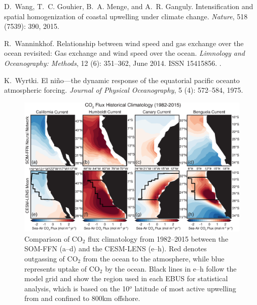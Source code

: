 \documentclass[hvmath, online,bgd]{copernicus_discussions}
\begin{document}
\begin{thebibliography}{84}
	D.~Wang, T.~C. Gouhier, B.~A. Menge, and A.~R. Ganguly.
	\newblock Intensification and spatial homogenization of coastal upwelling under
	climate change.
	\newblock \emph{Nature}, 518 (7539): 390, 2015.
	
	R.~Wanninkhof.
	\newblock Relationship between wind speed and gas exchange over the ocean
	revisited: {Gas} exchange and wind speed over the ocean.
	\newblock \emph{Limnology and Oceanography: Methods}, 12 (6):
	351--362, June 2014.
	\newblock ISSN 15415856.
	\newblock {}.
	
	K.~Wyrtki.
	\newblock El ni{\~n}o---the dynamic response of the equatorial pacific oceanto
	atmospheric forcing.
	\newblock \emph{Journal of Physical Oceanography}, 5 (4):
	572--584, 1975.
	
\end{thebibliography}




\clearpage
\begin{figure}[t]
\includegraphics[width=12cm]{figures/figure1.eps}
\caption{Comparison of CO$_{2}$ flux climatology from 1982--2015 between the SOM-FFN (a--d) and the CESM-LENS (e--h). Red denotes outgassing of CO$_{2}$ from the ocean to the atmosphere, while blue represents uptake of CO$_{2}$ by the ocean. Black lines in e--h follow the model grid and show the region used in each EBUS for statistical analysis, which is based on the 10$^{o}$ latitude of most active upwelling from \citet{Chavez:2009} and confined to 800km offshore.}
\label{Fig:Eval}
\end{figure}
\end{document}
